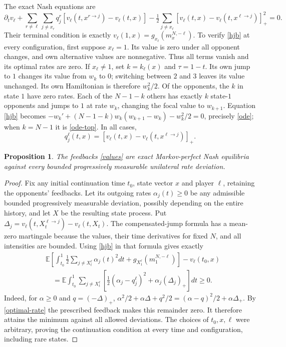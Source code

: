 \documentclass[11pt,a4paper]{article}
\newtheorem{proposition}{Proposition}
\newcommand{\E}{\mathbb E}
\begin{document}
The exact Nash equations are
\begin{equation}\label{hjb}
 \partial_t v_\ell+
 \sum_{r\ne\ell}\sum_{j\ne x_r}q_j^r
 [v_\ell(t,x^{r\to j})-v_\ell(t,x)]
 -\tfrac12\sum_{j\ne x_\ell}
 [v_\ell(t,x)-v_\ell(t,x^{\ell\to j})]_+^2=0.
\end{equation}
Their terminal condition is exactly
$v_\ell(1,x)=g_{x_\ell}(m^{N,-\ell}_x)$.
To verify \eqref{hjb} at every configuration, first suppose $x_\ell=1$.
Its value is zero under all opponent changes, and own alternative
values are nonnegative. Thus all terms vanish and its optimal rates
are zero. If $x_\ell\ne1$, set $k=k_\ell(x)$ and $\tau=1-t$.
Its own jump to $1$ changes its value from $w_k$ to $0$; switching
between $2$ and $3$ leaves its value unchanged. Its own Hamiltonian
is therefore $w_k^2/2$. Of the opponents, the $k$ in state $1$ have
zero rates. Each of the $N-1-k$ others has exactly $k$ state-$1$
opponents and jumps to $1$ at rate $w_k$, changing the focal value
to $w_{k+1}$. Equation \eqref{hjb} becomes
$-w_k'+(N-1-k)w_k(w_{k+1}-w_k)-w_k^2/2=0$, precisely
\eqref{ode}; when $k=N-1$ it is \eqref{ode-top}. In all cases,
\begin{equation}\label{optimal-rate}
 q_j^\ell(t,x)=[v_\ell(t,x)-v_\ell(t,x^{\ell\to j})]_+.
\end{equation}

\begin{proposition}\label{mpe}
The feedbacks \eqref{values} are exact Markov-perfect Nash equilibria
against every bounded progressively measurable unilateral rate deviation.
\end{proposition}
\begin{proof}
Fix any initial continuation time $t_0$, state vector $x$ and player
$\ell$, retaining the opponents' feedbacks. Let its outgoing rates
$\alpha_j(t)\ge0$ be any admissible bounded progressively measurable
deviation, possibly depending on the entire history, and let $X$ be
the resulting state process. Put
$\Delta_j=v_\ell(t,X_t^{\ell\to j})-v_\ell(t,X_t)$.
The compensated-jump formula has a mean-zero martingale because the
values, their time derivatives for fixed $N$, and all intensities
are bounded. Using \eqref{hjb} in that formula gives exactly
\begin{align}\label{verify}
 &\E\left[\int_{t_0}^1\tfrac12\sum_{j\ne X_t^\ell}\alpha_j(t)^2dt
 +g_{X_1^\ell}(m_1^{N,-\ell})\right]-v_\ell(t_0,x)\nonumber\\
 &\quad=\E\int_{t_0}^1\sum_{j\ne X_t^\ell}
 \left[\tfrac12(\alpha_j-q_j^\ell)^2+\alpha_j(\Delta_j)_+\right]dt\ge0.
\end{align}
Indeed, for $\alpha\ge0$ and $q=(-\Delta)_+$,
$\alpha^2/2+\alpha\Delta+q^2/2
=(\alpha-q)^2/2+\alpha\Delta_+$.
By \eqref{optimal-rate} the prescribed feedback makes this remainder
zero. It therefore attains the minimum against all allowed deviations.
The choices of $t_0,x,\ell$ were arbitrary, proving the continuation
condition at every time and configuration, including rare states.
\end{proof}
\end{document}
